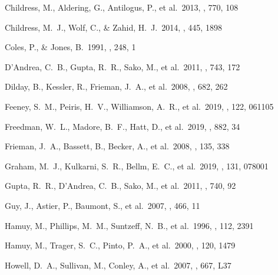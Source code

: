 \documentclass[]{aa} %
\begin{document}
\begin{thebibliography}{}
 Childress, M., Aldering, G., Antilogus, P., et al.\ 2013, \apj, 770, 108

 Childress, M.~J., Wolf, C., \& Zahid, H.~J.\ 2014, \mnras, 445, 1898


 Coles, P., \& Jones, B.\ 1991, \mnras, 248, 1



 D'Andrea, C.~B., Gupta, R.~R., Sako, M., et al.\ 2011, \apj, 743, 172

 Dilday, B., Kessler, R., Frieman, J.~A., et al.\ 2008, \apj, 682, 262


 Feeney, S.~M., Peiris, H.~V., Williamson, A.~R., et al.\ 2019, \prl, 122, 061105

 Freedman, W.~L., Madore, B.~F., Hatt, D., et al.\ 2019, \apj, 882, 34

 Frieman, J.~A., Bassett, B., Becker, A., et al.\ 2008, \aj, 135, 338


 Graham, M.~J., Kulkarni, S.~R., Bellm, E.~C., et al.\ 2019, \pasp, 131, 078001

 Gupta, R.~R., D'Andrea, C.~B., Sako, M., et al.\ 2011, \apj, 740, 92

 Guy, J., Astier, P., Baumont, S., et al.\ 2007, \aap, 466, 11



 Hamuy, M., Phillips, M.~M., Suntzeff, N.~B., et al.\ 1996, \aj, 112, 2391

 Hamuy, M., Trager, S.~C., Pinto, P.~A., et al.\ 2000, \aj, 120, 1479

 Howell, D.~A., Sullivan, M., Conley, A., et al.\ 2007, \apjl, 667, L37


\end{thebibliography}
\end{document}
